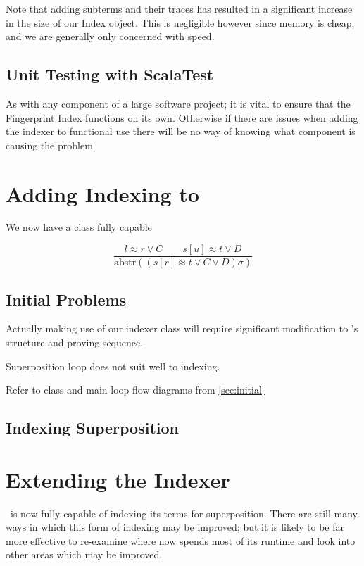 Note that adding subterms and their traces has resulted in a significant increase in the
size of our Index object. This is negligible however since memory is cheap; and we are
generally only concerned with speed.

\subsection{Unit Testing with ScalaTest}

As with any component of a large software project; it is vital to ensure that the
Fingerprint Index functions on its own. Otherwise if there are issues when adding
the indexer to functional use there will be no way of knowing what component is
causing the problem.


\section{Adding Indexing to \Beagle}
We now have a class fully capable 

\[ \frac{l \approx r \lor C\quad \quad s[u] \approx t \lor D}{\text{abstr}((s[r] \approx t \lor C \lor D)\sigma)} \]


\subsection{Initial Problems}

Actually making use of our indexer class will require significant modification
to \beagle's structure and proving sequence.

Superposition loop does not suit well to indexing. 

Refer to class and main loop flow diagrams from \ref{sec:initial}

\subsection{Indexing Superposition}


\section{Extending the Indexer}

\Beagle\ is now fully capable of indexing its terms for superposition. There
are still many ways in which this form of indexing may be improved; but it is likely
to be far more effective to re-examine where \beagle now spends most of its runtime
and look into other areas which may be improved. 

